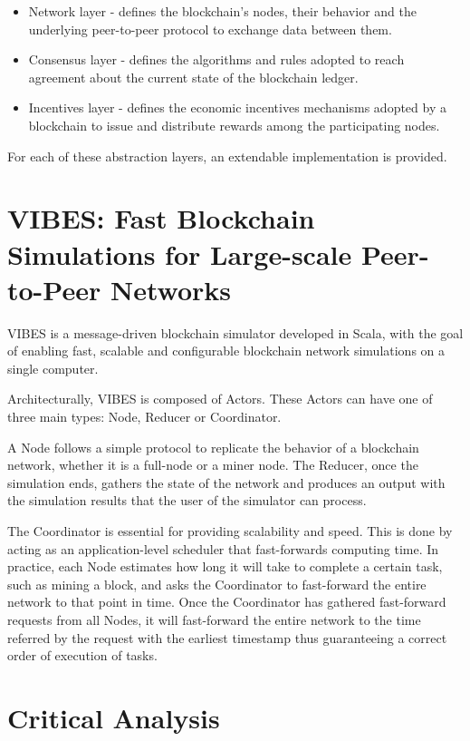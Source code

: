 \begin{itemize}
	\item Network layer - defines the blockchain’s nodes, their behavior and the underlying peer-to-peer protocol to exchange data between them.
	\item Consensus layer - defines the algorithms and rules adopted to reach agreement about the current state of the blockchain ledger.
	\item Incentives layer - defines the economic incentives mechanisms adopted by a blockchain to issue and distribute rewards among the participating nodes.
\end{itemize}

For each of these abstraction layers, an extendable implementation is provided.


\section{VIBES: Fast Blockchain Simulations for Large-scale Peer-to-Peer Networks}
\label{sec:vibes}

VIBES \cite{vibes} is a message-driven blockchain simulator developed in Scala, with the goal of enabling fast, scalable and configurable blockchain network simulations on a single computer.

Architecturally, VIBES is composed of Actors. These Actors can have one of three main types: Node, Reducer or Coordinator.

A Node follows a simple protocol to replicate the behavior of a blockchain network, whether it is a full-node or a miner node. The Reducer, once the simulation ends, gathers the state of the network and produces an output with the simulation results that the user of the simulator can process.

The Coordinator is essential for providing scalability and speed. This is done by acting as an application-level scheduler that fast-forwards computing time. In practice, each Node estimates how long it will take to complete a certain task, such as mining a block, and asks the Coordinator to fast-forward the entire network to that point in time. Once the Coordinator has gathered fast-forward requests from all Nodes, it will fast-forward the entire network to the time referred by the request with the earliest timestamp thus guaranteeing a correct order of execution of tasks.


\section{Critical Analysis}
\label{sec:critical_analysis}



